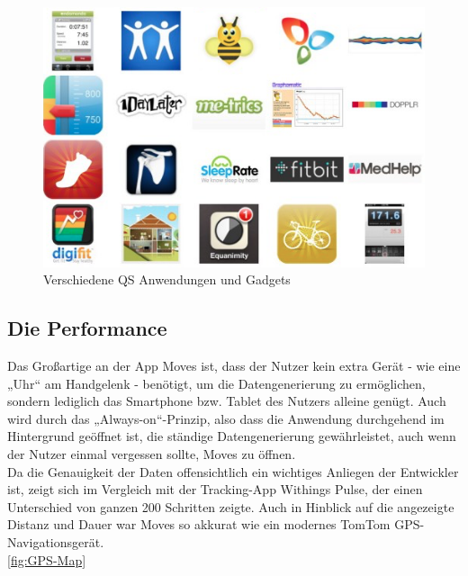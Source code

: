\begin{figure}[H]
 \centering
 \includegraphics[scale=0.3]{images/qs-anwndungen-gadgets.png}
 \caption{Verschiedene QS Anwendungen und Gadgets \cite{fig:Anwendungen}}
 \label{fig:Anwendungen}
\end{figure}

\subsection{Die Performance}
\label{ch:Apps:sec:Moves:subsec:PERF}

Das Großartige an der App Moves ist, dass der Nutzer kein extra Gerät - wie eine „Uhr“ am Handgelenk - benötigt, um die Datengenerierung zu ermöglichen, sondern lediglich das Smartphone bzw. Tablet des Nutzers alleine genügt. 
Auch wird durch das „Always-on“-Prinzip, also dass die Anwendung durchgehend im Hintergrund geöffnet ist, die ständige Datengenerierung gewährleistet, auch wenn der Nutzer einmal vergessen sollte, Moves zu öffnen.
\\
Da die Genauigkeit der Daten offensichtlich ein wichtiges Anliegen der Entwickler ist, zeigt sich im Vergleich mit der Tracking-App Withings Pulse, der einen Unterschied von ganzen 200 Schritten zeigte. 
Auch in Hinblick auf die angezeigte Distanz und Dauer war Moves so akkurat wie ein modernes TomTom GPS-Navigationsgerät.
\\
\ref{fig:GPS-Map}

